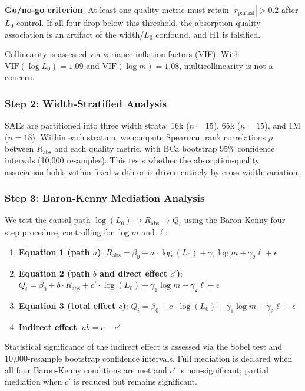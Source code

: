 \documentclass{article}
\begin{document}
\textbf{Go/no-go criterion}: At least one quality metric must retain $|r_{\text{partial}}| > 0.2$ after $L_0$ control.
If all four drop below this threshold, the absorption-quality association is an artifact of the width/$L_0$ confound, and H1 is falsified.

Collinearity is assessed via variance inflation factors (VIF).
With $\text{VIF}(\log L_0) = 1.09$ and $\text{VIF}(\log m) = 1.08$, multicollinearity is not a concern.

\subsubsection{Step 2: Width-Stratified Analysis}

SAEs are partitioned into three width strata: 16k ($n = 15$), 65k ($n = 15$), and 1M ($n = 18$).
Within each stratum, we compute Spearman rank correlations $\rho$ between $R_{\text{abs}}$ and each quality metric, with BCa bootstrap 95\% confidence intervals (10,000 resamples).
This tests whether the absorption-quality association holds within fixed width or is driven entirely by cross-width variation.

\subsubsection{Step 3: Baron-Kenny Mediation Analysis}

We test the causal path $\log(L_0) \to R_{\text{abs}} \to Q_i$ using the Baron-Kenny four-step procedure, controlling for $\log m$ and $\ell$:
\begin{enumerate}
\item \textbf{Equation 1 (path $a$)}: $R_{\text{abs}} = \beta_0 + a \cdot \log(L_0) + \gamma_1 \log m + \gamma_2 \ell + \epsilon$
\item \textbf{Equation 2 (path $b$ and direct effect $c'$)}: $Q_i = \beta_0 + b \cdot R_{\text{abs}} + c' \cdot \log(L_0) + \gamma_1 \log m + \gamma_2 \ell + \epsilon$
\item \textbf{Equation 3 (total effect $c$)}: $Q_i = \beta_0 + c \cdot \log(L_0) + \gamma_1 \log m + \gamma_2 \ell + \epsilon$
\item \textbf{Indirect effect}: $ab = c - c'$
\end{enumerate}

Statistical significance of the indirect effect is assessed via the Sobel test and 10,000-resample bootstrap confidence intervals.
Full mediation is declared when all four Baron-Kenny conditions are met and $c'$ is non-significant; partial mediation when $c'$ is reduced but remains significant.
\end{document}
